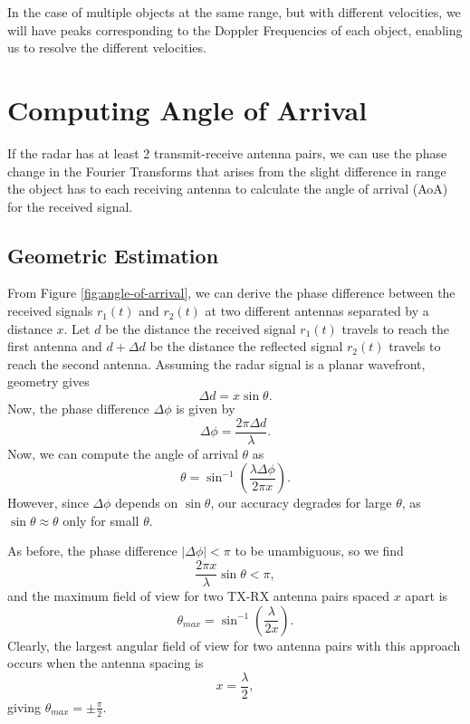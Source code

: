 In the case of multiple objects at the same range, but with different
velocities, we will have peaks corresponding to the Doppler Frequencies of each
object, enabling us to resolve the different velocities.

\section{Computing Angle of Arrival}
\label{sec:aoa}
If the radar has at least 2 transmit-receive antenna pairs, we can use the
phase change in the Fourier Transforms that arises from the slight difference
in range the object has to each receiving antenna to calculate the angle of
arrival (AoA) for the received signal. 

%		

\subsection{Geometric Estimation}
From Figure \ref{fig:angle-of-arrival}, we can derive the phase difference
between the received signals $r_1(t)$ and $r_2(t)$ at two different antennas
separated by a distance $x$. Let $d$ be the distance the received signal
$r_1(t)$ travels to reach the first antenna  and $ d + \Delta d$ be the distance
the reflected signal $r_2(t)$ travels to reach the second antenna. Assuming the
radar signal is a planar wavefront, geometry gives
\begin{equation}
	\Delta d = x \sin \theta. 
\end{equation}
Now, the phase difference $\Delta \phi$ is given by
\begin{equation}
	\Delta \phi = \frac{2\pi \Delta d}{\lambda}.
\end{equation}
Now, we can compute the angle of arrival $\theta$ as 
\begin{equation}
	\theta = \sin^{-1}(\frac{\lambda\Delta\phi}{2\pi x}).
\end{equation}
However, since $\Delta\phi$ depends on $\sin\theta$, our accuracy degrades for
large $\theta$, as $\sin\theta \approx \theta$ only for small $\theta$. 

As before, the phase difference $|\Delta\phi |<\pi$ to be unambiguous, so we
find
\begin{equation}
	\frac{2\pi x}{\lambda} \sin\theta < \pi,
\end{equation}
and the maximum field of view for two TX-RX antenna pairs spaced $x$ apart is 
\begin{equation}
	\theta_{max} = \sin^{-1}(\frac{\lambda}{2x}).
\end{equation}
Clearly, the largest angular field of view for two antenna pairs with this
approach occurs when the antenna spacing is
\begin{equation}
	x = \frac{\lambda}{2},
\end{equation}
giving $\theta_{max} = \pm\frac{\pi}{2}$.

